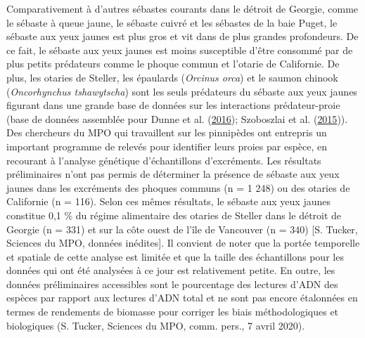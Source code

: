 \documentclass[11pt]{book}
\begin{document}
Comparativement à d'autres sébastes courants dans le détroit de Georgie, comme le sébaste à queue jaune, le sébaste cuivré et les sébastes de la baie Puget, le sébaste aux yeux jaunes est plus gros et vit dans de plus grandes profondeurs. De ce fait, le sébaste aux yeux jaunes est moins susceptible d'être consommé par de plus petits prédateurs comme le phoque commun et l'otarie de Californie. De plus, les otaries de Steller, les épaulards (\emph{Orcinus orca}) et le saumon chinook (\emph{Oncorhynchus tshawytscha}) sont les seuls prédateurs du sébaste aux yeux jaunes figurant dans une grande base de données sur les interactions prédateur-proie (base de données assemblée pour Dunne et al. (\protect\hyperlink{ref-dunne2016}{2016}); Szoboszlai et al. (\protect\hyperlink{ref-szoboszlai2015}{2015})). Des chercheurs du MPO qui travaillent sur les pinnipèdes ont entrepris un important programme de relevés pour identifier leurs proies par espèce, en recourant à l'analyse génétique d'échantillons d'excréments. Les résultats préliminaires n'ont pas permis de déterminer la présence de sébaste aux yeux jaunes dans les excréments des phoques communs (n = 1 248) ou des otaries de Californie (n = 116). Selon ces mêmes résultats, le sébaste aux yeux jaunes constitue 0,1 \% du régime alimentaire des otaries de Steller dans le détroit de Georgie (n = 331) et sur la côte ouest de l'île de Vancouver (n = 340) {[}S. Tucker, Sciences du MPO, données inédites{]}. Il convient de noter que la portée temporelle et spatiale de cette analyse est limitée et que la taille des échantillons pour les données qui ont été analysées à ce jour est relativement petite. En outre, les données préliminaires accessibles sont le pourcentage des lectures d'ADN des espèces par rapport aux lectures d'ADN total et ne sont pas encore étalonnées en termes de rendements de biomasse pour corriger les biais méthodologiques et biologiques (S. Tucker, Sciences du MPO, comm. pers., 7 avril 2020).
\end{document}
